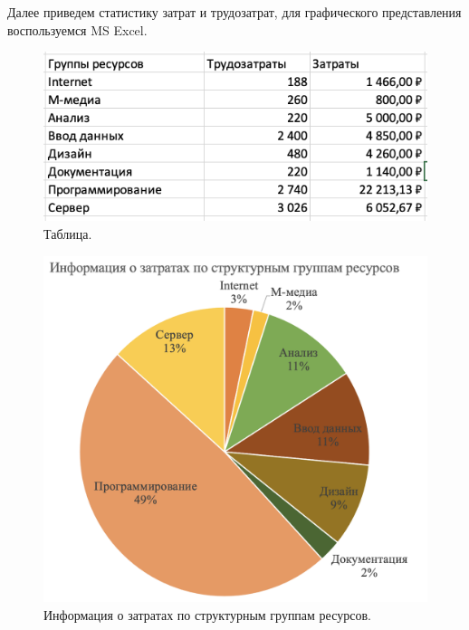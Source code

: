 \documentclass[a4paper,14pt]{extreport} %
\begin{document}
\begin{enumerate}
Далее приведем статистику затрат и трудозатрат, для графического представления воспользуемся MS Excel.

\begin{figure}[H]
  \centering
  \caption{Таблица. }
  \includegraphics[scale=0.5]{table}
\end{figure}

\begin{figure}[H]
  \centering
  \caption{Информация о затратах по структурным группам ресурсов. }
  \includegraphics[scale=0.75]{d1}
\end{figure}


\end{enumerate}
\end{document}
